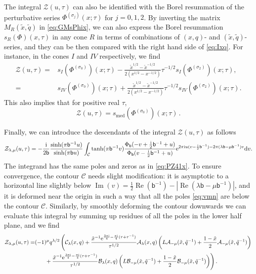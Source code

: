 \documentclass[12pt,reqno]{amsart}
\theoremstyle{definition}
\def\s{\sigma}
\def\tq{\tilde{q}}
\def\tx{\tilde{x}}
\def\bb{\mathsf{b}}
\def\ri{\mathrm{i}}
\def\rd{\mathrm{d}}
\def\tx{\tilde{x}}
\def\re{{\rm e}}
\def\ri{{\rm i}}
\def\rd{{\rm d}}
\def\mc{\mathcal}
\DeclareMathOperator{\real}{Re}
\DeclareMathOperator{\imag}{Im}
\newcommand{\nn}{\nonumber \\}
\begin{document}
The integral $\mc{Z}(u,\tau)$ can also be identified with the Borel
resummation of the perturbative series $\Phi^{(\s_j)}(x;\tau)$ for
$j=0,1,2$.  By inverting the matrix $M_R(\tx,\tq)$ in
\eqref{eq:GMsPhix}, we can also express the Borel resummation
$s_R(\Phi)(x,\tau)$ in any cone $R$ in terms of combinations of
$(x,q)$- and $(\tx,\tq)$-series, and they can be then compared with
the right hand side of \eqref{eq:Ixq}.  For instance, in the cones $I$
and $IV$ respectively, we find 
\begin{subequations}
\begin{align}
  \mc{Z}(u,\tau) =
  &s_I(\Phi^{(\s_0)})(x;\tau) -
    \frac{\tx^{1/2}-\tx^{-1/2}}
    {2(x^{1/2}-x^{-1/2})}\tau^{-1/2}s_I(\Phi^{(\s_2)})(x;\tau), \label{eq:Isphi-1}
  \\ =
  &s_{IV}(\Phi^{(\s_0)})(x;\tau) +
  \frac{\tx^{1/2}-\tx^{-1/2}}{2(x^{1/2}-x^{-1/2})}\tau^{-1/2}s_{IV}(\Phi^{(\s_2)})(x;\tau).
  \label{eq:Isphi-2}
\end{align}
\end{subequations}
This also implies that for positive real $\tau$,
\begin{equation}
  \label{eq:Isphi-3}
  \mc{Z}(u,\tau) =s_{\text{med}}(\Phi^{(\s_0)})(x;\tau) \,.
\end{equation}

Finally, we can introduce the descendants of the integral $\mc{Z}(u,\tau)$
as follows
\begin{equation}
  \mc{Z}_{\lambda,\mu}(u,\tau) =
  -\frac{\ri}{2\bb}\frac{\sinh(\pi \bb^{-1} u)}
  {\sinh(\pi \bb u)}
  \int_{\mc{C}} \tanh(\pi\bb^{-1}v)
  \frac{\Phi_\bb(-v+\frac{\ri}{2}\bb^{-1}+u)}
  {\Phi_\bb(v-\frac{\ri}{2}\bb^{-1}+u)}
  \re^{2\pi\ri u(v-\frac{\ri}{2}\bb^{-1})-2\pi(\lambda\bb-\mu\bb^{-1})v}
  \rd v.
\end{equation}
The integrand has the same poles and zeros as in \eqref{eq:PZ41x}.  To
ensure convergence, the contour $\mc{C}$ needs slight modification: it
is asymptotic to a horizontal line slightly below
$\imag(v) = \frac{1}{2}\real(\bb^{-1})
-|\real(\lambda\bb-\mu\bb^{-1})|$, and it is deformed near the origin
in such a way that all the poles \eqref{eq:vmn} are below the contour
$\mc{C}$.
%
Similarly, by smoothly deforming the contour downwards we can evaluate
this integral by summing up residues of all the poles in the lower
half plane, and we find 
\begin{align}
  \mc{Z}_{\lambda,\mu}(u,\tau) =
  &(-1)^\mu q^{\lambda/2}\left(
    \mc{C}_\lambda(x,q)
    +\frac{\tx^{-1}\re^{\frac{3\pi\ri}{4}-\frac{\pi\ri}{4}(\tau+\tau^{-1})}}
    {\tau^{1/2}}
    \mc{A}_\lambda(x,q)\left(L\mc{A}_{-\mu}(\tx,\tq^{-1})
    +\frac{1-\tx}{2}\mc{A}_{-\mu}(\tx,\tq^{-1})\right)\right.\nn
  &\left.\phantom{==}
    +\frac{\tx^{-1}\re^{\frac{3\pi\ri}{4}-\frac{\pi\ri}{4}(\tau+\tau^{-1})}}
    {\tau^{1/2}}
    \mc{B}_\lambda(x,q)\left(L\mc{B}_{-\mu}(\tx,\tq^{-1})
    +\frac{1-\tx}{2}\mc{B}_{-\mu}(\tx,\tq^{-1})\right)
    \right).
\end{align}
\end{document}

